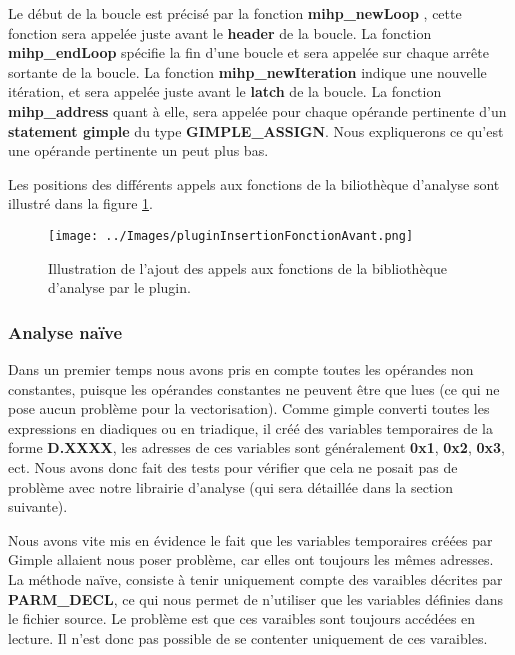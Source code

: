 \documentclass[12pt,french]{article}
\begin{document}
Le début de la boucle est précisé par la fonction
\textbf{mihp\_newLoop}
, cette fonction sera appelée juste avant le \textbf{header} de la boucle. La fonction \textbf{mihp\_endLoop} spécifie la fin d'une boucle et sera appelée sur chaque arrête sortante de la boucle. La fonction \textbf{mihp\_newIteration} indique une nouvelle itération, et sera appelée juste avant le
\textbf{latch} de la boucle. La fonction \textbf{mihp\_address} quant à elle, sera appelée pour chaque opérande pertinente d'un \textbf{statement gimple} du type \textbf{GIMPLE\_ASSIGN}. Nous expliquerons ce qu'est une opérande pertinente un peut plus bas. 

Les positions des différents appels aux fonctions de la biliothèque d'analyse sont illustré dans la figure \ref{DiagrammeAddFunction}.


\begin{figure}
	\begin{center}
		\texttt{[image: ../Images/pluginInsertionFonctionAvant.png]}
	\end{center}
	\caption{Illustration de l'ajout des appels aux fonctions de la bibliothèque d'analyse par le plugin.}
	\label{DiagrammeAddFunction}
\end{figure}

		\subsubsection{\color{blue}Analyse naïve}

Dans un premier temps nous avons pris en compte toutes les opérandes non constantes, puisque les opérandes constantes ne peuvent être que lues (ce qui ne pose aucun problème pour la vectorisation). Comme gimple converti toutes les expressions en diadiques ou en triadique, il créé des variables temporaires de la forme \textbf{D.XXXX}, les adresses de ces variables sont généralement \textbf{0x1}, \textbf{0x2}, \textbf{0x3}, ect. Nous avons donc fait des tests pour vérifier que cela ne posait pas de problème avec notre librairie d'analyse (qui sera détaillée dans la section suivante).

Nous avons vite mis en évidence le fait que les variables temporaires créées par Gimple allaient nous poser problème, car elles ont toujours les mêmes adresses. La méthode naïve, consiste à tenir uniquement compte des varaibles décrites par \textbf{PARM\_DECL}, ce qui nous permet de n'utiliser que les variables définies dans le fichier source. Le problème est que ces varaibles sont toujours accédées en lecture. Il n'est donc pas possible de se contenter uniquement de ces varaibles.
\end{document}
